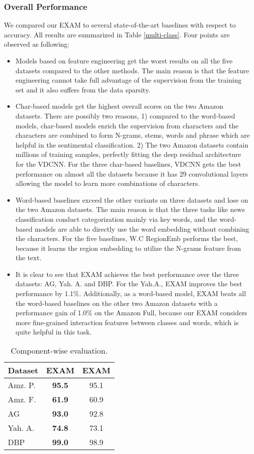 \documentclass[letterpaper]{article} \usepackage{aaai19}  \usepackage{times}  \usepackage{helvet}  \usepackage{courier}  \usepackage{url}  \usepackage{graphicx}
\begin{document}
\subsubsection{Overall Performance}
We compared our EXAM to several state-of-the-art baselines with respect to accuracy. All results are summarized in Table \ref{multi-class}. Four points are observed as following:
\begin{itemize}
\item Models based on feature engineering get the worst results on all the five datasets compared to the other methods. The main reason is that the feature engineering cannot take full advantage of the supervision from the training set and it also suffers from the data sparsity.
\item Char-based models get the highest overall scores on the two Amazon datasets. There are possibly two reasons, 1) compared to the word-based models, char-based models enrich the supervision from characters and the characters are combined to form N-grams, stems, words and phrase which are helpful in the sentimental classification. 2) The two Amazon datasets contain millions of training samples, perfectly fitting the deep residual architecture for the VDCNN. For the three char-based baselines, VDCNN gets the best performance on almost all the datasets because it has 29 convolutional layers allowing the model to learn more combinations of characters.
\item Word-based baselines exceed the other variants on three datasets and lose on the two Amazon datasets. The main reason is that the three tasks like news classification conduct categorization mainly via key words, and the word-based models are able to directly use the word embedding without combining the characters. For the five baselines, W.C RegionEmb performs the best, because it learns the region embedding to utilize the N-grams feature from the text.
\item It is clear to see that EXAM achieves the best performance over the three datasets: AG, Yah. A. and DBP. For the Yah.A., EXAM improves the best performance by 1.1\%. Additionally, as a word-based model, EXAM beats all the word-based baselines on the other two Amazon datasets with a performance gain of 1.0\% on the Amazon Full, because our EXAM considers more fine-grained interaction features between classes and words, which is quite helpful in this task.
\end{itemize}
\begin{table}
  \caption{Component-wise evaluation.}
  \label{componment}
  \centering
\begin{tabular}{lcc}
    \toprule
     Dataset & EXAM & EXAM\\
         \midrule
     Amz. P. & \textbf{95.5}  &95.1 \\
     Amz. F. & \textbf{61.9} &60.9 \\
     AG      &\textbf{93.0}  & 92.8\\
     Yah. A. &\textbf{74.8}  &73.1\\
     DBP     &\textbf{99.0} &98.9 \\
    \bottomrule
  \end{tabular}
\end{table}
\end{document}
